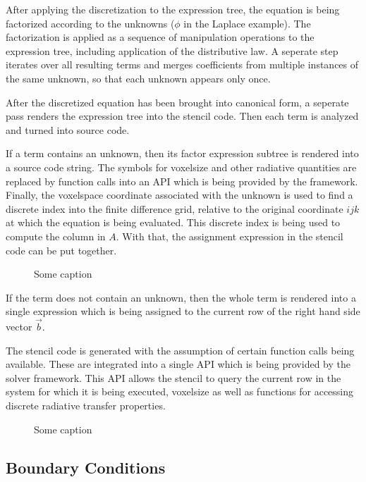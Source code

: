 After applying the discretization to the expression tree, the equation is being factorized according to the unknowns ($\phi$ in the Laplace example). The factorization is applied as a sequence of manipulation operations to the expression tree, including application of the distributive law. A seperate step iterates over all resulting terms and merges coefficients from multiple instances of the same unknown, so that each unknown appears only once. 

After the discretized equation has been brought into canonical form, a seperate pass renders the expression tree into the stencil code. Then each term is analyzed and turned into source code.

If a term contains an unknown, then its factor expression subtree is rendered into a source code string. The symbols for voxelsize and other radiative quantities are replaced by function calls into an API which is being provided by the framework. Finally, the voxelspace coordinate associated with the unknown is used to find a discrete index into the finite difference grid, relative to the original coordinate $ijk$ at which the equation is being evaluated. This discrete index is being used to compute the column in $A$. With that, the assignment expression in the stencil code can be put together.
\begin{figure}[h]
\centering
{}
\caption{Some caption}
\label{fig:pn_discretization_codegen}
\end{figure}
If the term does not contain an unknown, then the whole term is rendered into a single expression which is being assigned to the current row of the right hand side vector $\vec{b}$.

The stencil code is generated with the assumption of certain function calls being available. These are integrated into a single API which is being provided by the solver framework. This API allows the stencil to query the current row in the system for which it is being executed, voxelsize as well as functions for accessing discrete radiative transfer properties.
\begin{figure}[h]
\centering
{}
\caption{Some caption}
\label{fig:pn_discretization_codegen_stencilAPI}
\end{figure}


\subsection{Boundary Conditions}
\label{sec:pn_bc}

